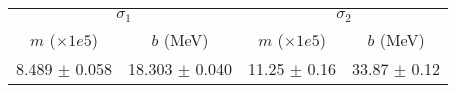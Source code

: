 \begin{tabular}{cc|cc}
\multicolumn{2}{c|}{$\sigma_1$} & \multicolumn{2}{|c}{$\sigma_2$} \\
$m$ ($\times1e5$) & $b$ (MeV) & $m$ ($\times1e5$) & $b$ (MeV) \\
\hline
8.489 $\pm$ 0.058 & 18.303 $\pm$ 0.040 & 11.25 $\pm$ 0.16 & 33.87 $\pm$ 0.12\\
\end{tabular}
